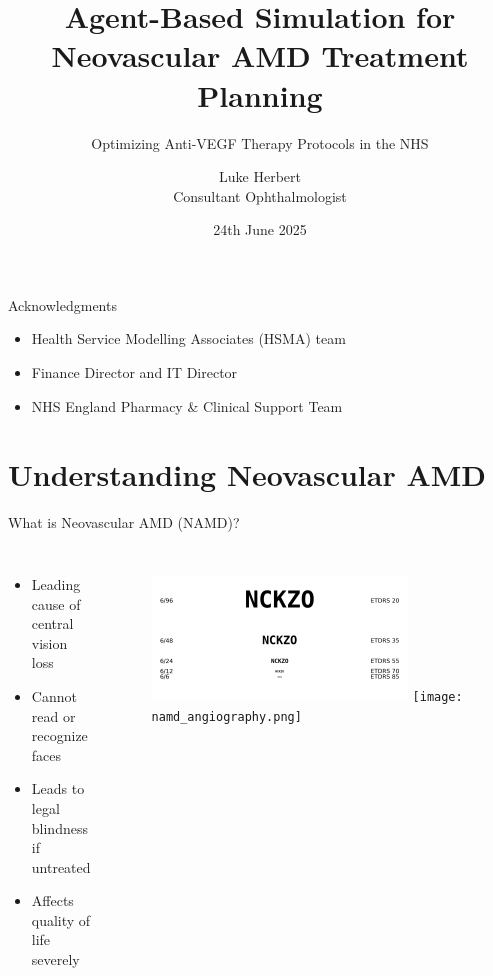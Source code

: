 \documentclass[10pt,aspectratio=169]{beamer}
\title{Agent-Based Simulation for Neovascular AMD Treatment Planning}
\subtitle{Optimizing Anti-VEGF Therapy Protocols in the NHS}
\author{Luke Herbert\\Consultant Ophthalmologist}
\institute{Surrey and Sussex Healthcare NHS Trust}
\date{24th June 2025}
\begin{document}
\maketitle

\begin{frame}{Acknowledgments}
\begin{itemize}
    \item Health Service Modelling Associates (HSMA) team
    \item Finance Director and IT Director
    \item NHS England Pharmacy \& Clinical Support Team
\end{itemize}
\end{frame}

\section{Understanding Neovascular AMD}

\begin{frame}{What is Neovascular AMD (NAMD)?}
\begin{columns}[T]
\begin{itemize}
    \item Leading cause of central vision loss
    \item Cannot read or recognize faces
    \item Leads to legal blindness if untreated
    \item Affects quality of life severely
\end{itemize}

\begin{figure}
    \centering
    \includegraphics[width=0.8\textwidth]{logMAR_chart_explainer.png}
    \vspace{0.3cm}
    \texttt{[image: namd\_angiography.png]}
\end{figure}
\end{columns}
\end{frame}
\end{document}
